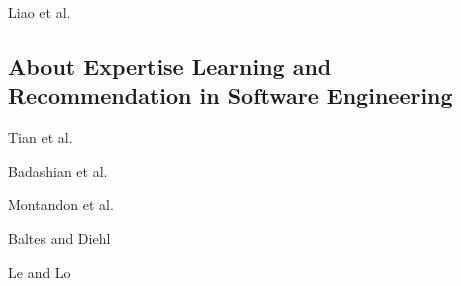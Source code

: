         Liao et al. \cite{liao2019status}

    \subsection{About Expertise Learning and Recommendation in Software Engineering}
        
        Tian et al. \cite{tian2013predicting}
        
        Badashian et al. \cite{badashian2016crowdsourced}
        
        Montandon et al. \cite{montandon2019identifying}
        
        Baltes and Diehl \cite{baltes2018towards}

        Le and Lo \cite{le2015beyond}
        
    
